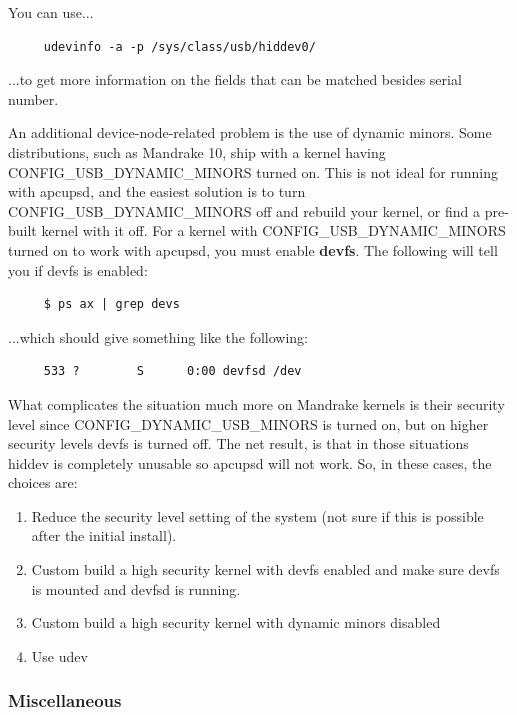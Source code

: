 You can use...

\begin{verbatim}
     udevinfo -a -p /sys/class/usb/hiddev0/
\end{verbatim}

...to get more information on the fields that can be matched besides serial number.


An additional device-node-related problem is the use of dynamic minors. Some
distributions, such as Mandrake 10, ship with a kernel having
CONFIG\_USB\_DYNAMIC\_MINORS turned on. This is not ideal for running with
apcupsd, and the easiest solution is to turn CONFIG\_USB\_DYNAMIC\_MINORS off
and rebuild your kernel, or find a pre-built kernel with it off. For a kernel with
CONFIG\_USB\_DYNAMIC\_MINORS turned on to work with apcupsd, you must enable
{\bf devfs}. The following will tell you if devfs is enabled: 

\begin{verbatim}
     $ ps ax | grep devs
\end{verbatim}

...which should give something like the following: 

\begin{verbatim}
     533 ?        S      0:00 devfsd /dev
\end{verbatim}

What complicates the situation much more on Mandrake kernels is their security
level since CONFIG\_DYNAMIC\_USB\_MINORS is turned on, but on higher security
levels devfs is turned off. The net result, is that in those situations hiddev
is completely unusable so apcupsd will not work. So, in these cases,
the choices are: 

\begin{enumerate}
    \item Reduce the security level setting of the system (not sure if 
    this is possible after the initial install).
    \item Custom build a high security kernel with devfs enabled and make
    sure devfs is mounted and devfsd is running.
    \item Custom build a high security kernel with dynamic minors disabled
    \item Use udev
\end{enumerate}

\subsubsection*{Miscellaneous}

